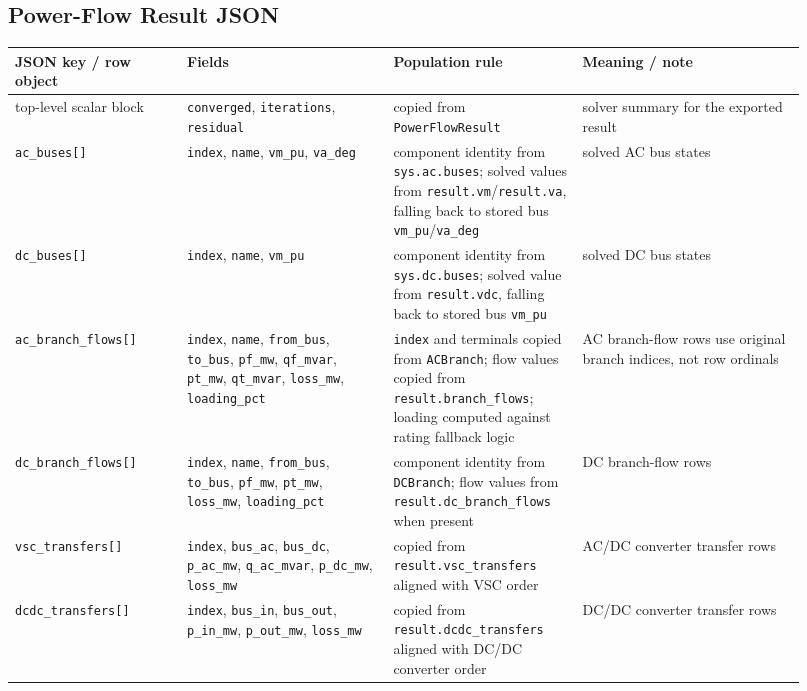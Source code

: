 \subsection{Power-Flow Result JSON}

\begin{longtable}{@{}L{0.20\linewidth}L{0.24\linewidth}L{0.22\linewidth}L{0.26\linewidth}@{}}
\toprule
JSON key / row object & Fields & Population rule & Meaning / note \\
\midrule
\endhead
top-level scalar block & \texttt{converged}, \texttt{iterations}, \texttt{residual} & copied from \texttt{PowerFlowResult} & solver summary for the exported result \\
\texttt{ac\_buses[]} & \texttt{index}, \texttt{name}, \texttt{vm\_pu}, \texttt{va\_deg} & component identity from \texttt{sys.ac.buses}; solved values from \texttt{result.vm}/\texttt{result.va}, falling back to stored bus \texttt{vm\_pu}/\texttt{va\_deg} & solved AC bus states \\
\texttt{dc\_buses[]} & \texttt{index}, \texttt{name}, \texttt{vm\_pu} & component identity from \texttt{sys.dc.buses}; solved value from \texttt{result.vdc}, falling back to stored bus \texttt{vm\_pu} & solved DC bus states \\
\texttt{ac\_branch\_flows[]} & \texttt{index}, \texttt{name}, \texttt{from\_bus}, \texttt{to\_bus}, \texttt{pf\_mw}, \texttt{qf\_mvar}, \texttt{pt\_mw}, \texttt{qt\_mvar}, \texttt{loss\_mw}, \texttt{loading\_pct} & \texttt{index} and terminals copied from \texttt{ACBranch}; flow values copied from \texttt{result.branch\_flows}; loading computed against rating fallback logic & AC branch-flow rows use original branch indices, not row ordinals \\
\texttt{dc\_branch\_flows[]} & \texttt{index}, \texttt{name}, \texttt{from\_bus}, \texttt{to\_bus}, \texttt{pf\_mw}, \texttt{pt\_mw}, \texttt{loss\_mw}, \texttt{loading\_pct} & component identity from \texttt{DCBranch}; flow values from \texttt{result.dc\_branch\_flows} when present & DC branch-flow rows \\
\texttt{vsc\_transfers[]} & \texttt{index}, \texttt{bus\_ac}, \texttt{bus\_dc}, \texttt{p\_ac\_mw}, \texttt{q\_ac\_mvar}, \texttt{p\_dc\_mw}, \texttt{loss\_mw} & copied from \texttt{result.vsc\_transfers} aligned with VSC order & AC/DC converter transfer rows \\
\texttt{dcdc\_transfers[]} & \texttt{index}, \texttt{bus\_in}, \texttt{bus\_out}, \texttt{p\_in\_mw}, \texttt{p\_out\_mw}, \texttt{loss\_mw} & copied from \texttt{result.dcdc\_transfers} aligned with DC/DC converter order & DC/DC converter transfer rows \\
\bottomrule
\end{longtable}

